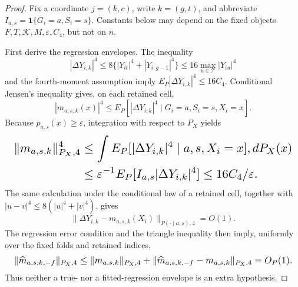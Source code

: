 \documentclass{article}
\begin{document}
\begin{proof}
Fix a coordinate \(j=(k,c)\), write \(k=(g,t)\), and abbreviate \(I_{a,s}=\mathbf 1\{G_i=a,S_i=s\}\). Constants below may depend on the fixed objects \(F,T,\mathcal K,M,\varepsilon,C_4\), but not on \(n\).

First derive the regression envelopes. The inequality
\[
 |\Delta Y_{i,k}|^4
 \le 8\{|Y_{it}|^4+|Y_{i,g-1}|^4\}
 \le16\max_{u\in\mathcal T}|Y_{iu}|^4
\]
and the fourth-moment assumption imply \(E_P|\Delta Y_{i,k}|^4\le16C_4\). Conditional Jensen's inequality gives, on each retained cell,
\[
 |m_{a,s,k}(x)|^4
 \le E_P[|\Delta Y_{i,k}|^4\mid G_i=a,S_i=s,X_i=x].
\]
Because \(p_{a,s}(x)\ge\varepsilon\), integration with respect to \(P_X\) yields
\[
\makebox[\linewidth][c]{\resizebox{0.98\linewidth}{!}{\(\displaystyle \begin{aligned}
 \|m_{a,s,k}\|_{P_X,4}^4
 &\le \int E_P[|\Delta Y_{i,k}|^4\mid a,s,X_i=x],dP_X(x)\\
 &\le \varepsilon^{-1}E_P[I_{a,s}|\Delta Y_{i,k}|^4]
 \le16C_4/\varepsilon.
\end{aligned}\)}}
\]
The same calculation under the conditional law of a retained cell, together with \(|u-v|^4\le8(|u|^4+|v|^4)\), gives
\[
 \|\Delta Y_{i,k}-m_{a,s,k}(X_i)\|_{P(\cdot\mid a,s),4}=O(1).
\]
The regression error condition and the triangle inequality then imply, uniformly over the fixed folds and retained indices,
\[
\makebox[\linewidth][c]{\resizebox{0.98\linewidth}{!}{\(\displaystyle \|\widehat m_{a,s,k,-f}\|_{P_X,4}
 \le \|m_{a,s,k}\|_{P_X,4}
 +\|\widehat m_{a,s,k,-f}-m_{a,s,k}\|_{P_X,4}
 =O_P(1).\)}}
\]
Thus neither a true- nor a fitted-regression envelope is an extra hypothesis.


\end{proof}
\end{document}
